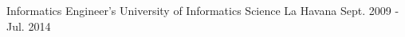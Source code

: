 


\begin{cventries}

\cventry
{Informatics Engineer’s} %
{University of Informatics Science} %
{La Havana} %
{Sept. 2009 - Jul. 2014} %
{ %
}


\end{cventries}
